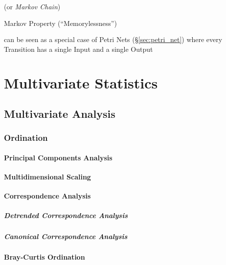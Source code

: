 (or \emph{Markov Chain})

Markov Property (``Memorylessness'')

can be seen as a special case of Petri Nets (\S\ref{sec:petri_net})
where every Transition has a single Input and a single Output



\section{Multivariate Statistics}\label{sec:multivariate_statistics}

\subsection{Multivariate Analysis}\label{sec:multivariate_analysis}

\subsubsection{Ordination}\label{sec:ordination}

\paragraph{Principal Components Analysis}
\label{sec:principal_components_analysis}\hfill

\paragraph{Multidimensional Scaling}\label{sec:multidimensional_scaling}\hfill

\paragraph{Correspondence Analysis}\label{sec:correspondence_analysis}\hfill

\subparagraph{Detrended Correspondence Analysis}
\label{sec:detrended_correspondence}\hfill

\subparagraph{Canonical Correspondence Analysis}
\label{sec:canonical_correspondence}\hfill



\paragraph{Bray-Curtis Ordination}\label{sec:bray_curtis_ordination}\hfill


